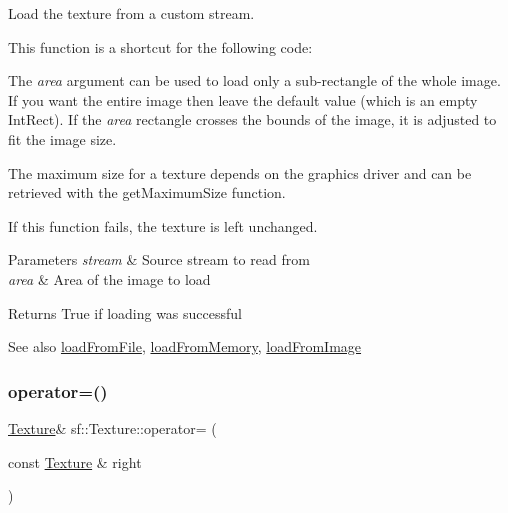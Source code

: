 Load the texture from a custom stream. 

This function is a shortcut for the following code\+: 
\begin{DoxyCode}{0}
\end{DoxyCode}


The {\itshape area} argument can be used to load only a sub-\/rectangle of the whole image. If you want the entire image then leave the default value (which is an empty Int\+Rect). If the {\itshape area} rectangle crosses the bounds of the image, it is adjusted to fit the image size.

The maximum size for a texture depends on the graphics driver and can be retrieved with the get\+Maximum\+Size function.

If this function fails, the texture is left unchanged.


\begin{DoxyParams}{Parameters}
{\em stream} & Source stream to read from \\
\hline
{\em area} & Area of the image to load\\
\hline
\end{DoxyParams}
\begin{DoxyReturn}{Returns}
True if loading was successful
\end{DoxyReturn}
\begin{DoxySeeAlso}{See also}
\mbox{\hyperlink{classsf_1_1_texture_a8e1b56eabfe33e2e0e1cb03712c7fcc7}{load\+From\+File}}, \mbox{\hyperlink{classsf_1_1_texture_a2c4adb19dd4cbee0a588eeb85e52a249}{load\+From\+Memory}}, \mbox{\hyperlink{classsf_1_1_texture_abec4567ad9856a3596dc74803f26fba2}{load\+From\+Image}} \begin{DoxyVerb}\end{DoxyVerb}
 
\end{DoxySeeAlso}
\mbox{\label{classsf_1_1_texture_a80a089b6b19bb09b83012d5f0e6af9ba}} 
\subsubsection{\texorpdfstring{operator=()}{operator=()}}
{\footnotesize\ttfamily \mbox{\hyperlink{classsf_1_1_texture}{Texture}}\& sf\+::\+Texture\+::operator= (\begin{DoxyParamCaption}\item[{const \mbox{\hyperlink{classsf_1_1_texture}{Texture}} \&}]{right }\end{DoxyParamCaption})}



